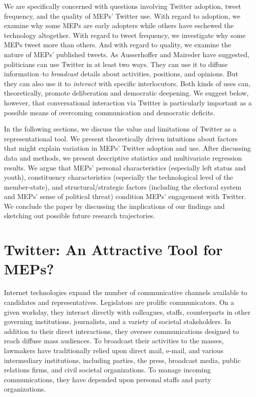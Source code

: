 \documentclass[12pt]{article}\usepackage[]{graphicx}\usepackage[]{color}
\begin{document}
		We are specifically concerned with questions involving Twitter adoption, tweet frequency, and the quality of MEPs' Twitter use. With regard to adoption, we examine why some MEPs are early adopters while others have eschewed the technology altogether. With regard to tweet frequency, we investigate why some MEPs tweet more than others.  And with regard to quality, we examine the nature of MEPs' published tweets.  As Ausserhoffer and Maireder \citeyear{ausserhoffer.maireder.2013} have suggested, politicians can use Twitter in at least two ways. They can use it to diffuse information--to \emph{broadcast} details about activities, positions, and opinions. But they can also use it to \emph{interact} with specific interlocutors. Both kinds of uses can, theoretically, promote deliberation and democratic deepening. We suggest below, however, that conversational interaction via Twitter is particularly important as a possible means of overcoming communication and democratic deficits.
		
		In the following sections, we discuss the value and limitations of Twitter as a representational tool. We present theoretically driven intuitions about factors that might explain variation in MEPs' Twitter adoption and use. After discussing data and methods, we present descriptive statistics and multivariate regression results. We argue that MEPs' personal characteristics (especially left status and youth), constituency characteristics (especially the technological level of the member-state), and structural/strategic factors (including the electoral system and MEPs' sense of political threat) condition MEPs' engagement with Twitter. We conclude the paper by discussing the implications of our findings and sketching out possible future research trajectories.
		
\section*{Twitter: An Attractive Tool for MEPs?} 
	 
		Internet technologies expand the number of communicative channels available to candidates and representatives. Legislators are prolific communicators. On a given workday, they interact directly with colleagues, staffs, counterparts in other governing institutions, journalists, and a variety of societal stakeholders. In addition to their direct interactions, they oversee communications designed to reach diffuse mass audiences. To broadcast their activities to the masses, lawmakers have traditionally relied upon direct mail, e-mail, and various intermediary institutions, including parties, the press, broadcast media, public relations firms, and civil societal organizations. To manage incoming communications, they have depended upon personal staffs and party organizations. 
		
\end{document}
